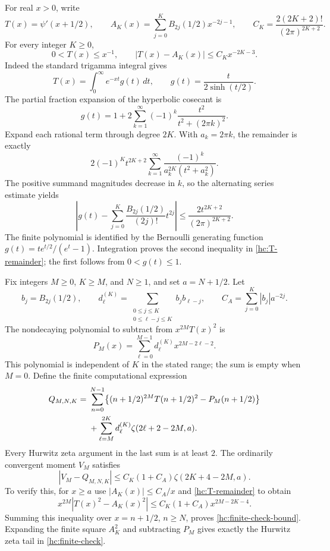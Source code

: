 \documentclass[11pt]{article}
\numberwithin{equation}{section}
\theoremstyle{definition}
\theoremstyle{remark}
\begin{document}
For real $x>0$, write
\[
 T(x)=\psi'(x+1/2),\qquad
 A_K(x)=\sum_{j=0}^{K}B_{2j}(1/2)x^{-2j-1},\qquad
 C_K=\frac{2(2K+2)!}{(2\pi)^{2K+2}}.
\]
For every integer $K\ge0$,
\begin{equation}\label{hc:T-remainder}
 0<T(x)\le x^{-1},\qquad
 |T(x)-A_K(x)|\le C_Kx^{-2K-3}.
\end{equation}
Indeed the standard trigamma integral gives
\[
 T(x)=\int_0^\infty e^{-xt}g(t)\,dt,
 \qquad g(t)=\frac{t}{2\sinh(t/2)}.
\]
The partial fraction expansion of the hyperbolic cosecant
\cite[Eq.~4.36.5]{DLMFHyperbolic} is
\[
 g(t)=1+2\sum_{k=1}^{\infty}
             (-1)^k\frac{t^2}{t^2+(2\pi k)^2}.
\]
Expand each rational term through degree $2K$. With $a_k=2\pi k$,
the remainder is exactly
\[
 2(-1)^K t^{2K+2}\sum_{k=1}^{\infty}
              \frac{(-1)^k}{a_k^{2K}(t^2+a_k^2)}.
\]
The positive summand magnitudes decrease in $k$, so the alternating
series estimate yields
\[
 \left|g(t)-\sum_{j=0}^{K}
       \frac{B_{2j}(1/2)}{(2j)!}t^{2j}\right|
 \le \frac{2t^{2K+2}}{(2\pi)^{2K+2}}.
\]
The finite polynomial is identified by the Bernoulli generating
function $g(t)=te^{t/2}/(e^t-1)$. Integration proves the second
inequality in \eqref{hc:T-remainder}; the first follows from
$0<g(t)\le1$.

Fix integers $M\ge0$, $K\ge M$, and $N\ge1$, and set $a=N+1/2$.
Let
\[
 b_j=B_{2j}(1/2),\qquad
 d_\ell^{(K)}=
 \sum_{\substack{0\le j\le K\\0\le\ell-j\le K}}
                    b_jb_{\ell-j},
 \qquad
 C_A=\sum_{j=0}^{K}|b_j|a^{-2j}.
\]
The nondecaying polynomial to subtract from $x^{2M}T(x)^2$ is
\[
 P_M(x)=\sum_{\ell=0}^{M-1}
                  d_\ell^{(K)}x^{2M-2\ell-2}.
\]
This polynomial is independent of $K$ in the stated range; the sum is
empty when $M=0$. Define the finite computational expression
\begin{align}\label{hc:finite-check}
 Q_{M,N,K}={}&
 \sum_{n=0}^{N-1}
   \bigl\{(n+1/2)^{2M}T(n+1/2)^2-P_M(n+1/2)\bigr\}\notag\\
 &+\sum_{\ell=M}^{2K}
          d_\ell^{(K)}\zeta(2\ell+2-2M,a).
\end{align}
Every Hurwitz zeta argument in the last sum is at least $2$.
The ordinarily convergent moment $V_M$ satisfies
\begin{equation}\label{hc:finite-check-bound}
 |V_M-Q_{M,N,K}|
 \le C_K(1+C_A)\zeta(2K+4-2M,a).
\end{equation}
To verify this, for $x\ge a$ use $|A_K(x)|\le C_A/x$ and
\eqref{hc:T-remainder} to obtain
\[
 x^{2M}|T(x)^2-A_K(x)^2|
 \le C_K(1+C_A)x^{2M-2K-4}.
\]
Summing this inequality over $x=n+1/2$, $n\ge N$, proves
\eqref{hc:finite-check-bound}. Expanding the finite square $A_K^2$
and subtracting $P_M$ gives exactly the Hurwitz zeta tail in
\eqref{hc:finite-check}.
\end{document}
